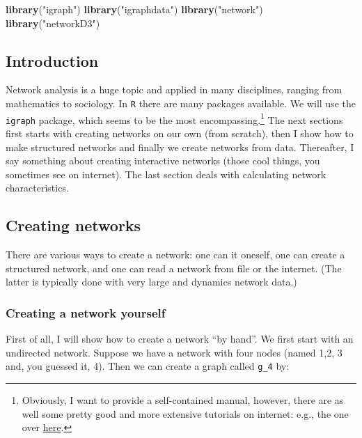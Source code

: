 \documentclass[]{article}
\newenvironment{Shaded}{\begin{snugshade}}{\end{snugshade}}
\newcommand{\KeywordTok}[1]{\textcolor[rgb]{0.13,0.29,0.53}{\textbf{#1}}}
\newcommand{\StringTok}[1]{\textcolor[rgb]{0.31,0.60,0.02}{#1}}
\newcommand{\NormalTok}[1]{#1}
\let\rmarkdownfootnote\footnote%
\def\footnote{\protect\rmarkdownfootnote}
\theoremstyle{definition}
\theoremstyle{definition}
\theoremstyle{definition}
\theoremstyle{remark}
\begin{document}
\begin{Shaded}
\begin{Highlighting}[]
\KeywordTok{library}\NormalTok{(}\StringTok{"igraph"}\NormalTok{)}
\KeywordTok{library}\NormalTok{(}\StringTok{"igraphdata"}\NormalTok{)}
\KeywordTok{library}\NormalTok{(}\StringTok{"network"}\NormalTok{)}
\KeywordTok{library}\NormalTok{(}\StringTok{"networkD3"}\NormalTok{)}
\end{Highlighting}
\end{Shaded}

\subsection{Introduction}\label{introduction-1}

Network analysis is a huge topic and applied in many disciplines,
ranging from mathematics to sociology. In \texttt{R} there are many
packages available. We will use the \texttt{igraph} package, which seems
to be the most encompassing.\footnote{Obviously, I want to provide a
  self-contained manual, however, there are as well some pretty good and
  more extensive tutorials on internet: e.g., the one over
  \href{http://kateto.net/networks-r-igraph/}{here}.} The next sections
first starts with creating networks on our own (from scratch), then I
show how to make structured networks and finally we create networks from
data. Thereafter, I say something about creating interactive networks
(those cool things, you sometimes see on internet). The last section
deals with calculating network characteristics.

\subsection{Creating networks}\label{creating-networks}

There are various ways to create a network: one can it oneself, one can
create a structured network, and one can read a network from file or the
internet. (The latter is typically done with very large and dynamics
network data.)

\subsubsection{Creating a network
yourself}\label{creating-a-network-yourself}

First of all, I will show how to create a network ``by hand''. We first
start with an undirected network. Suppose we have a network with four
nodes (named 1,2, 3 and, you guessed it, 4). Then we can create a graph
called \texttt{g\_4} by:
\end{document}
